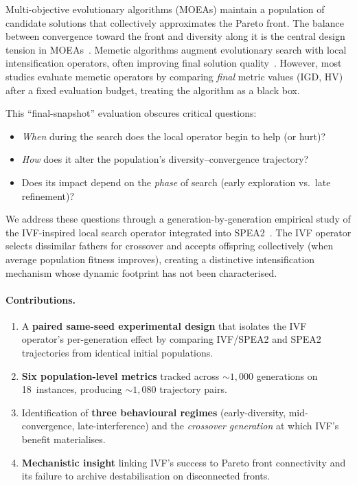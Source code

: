 \documentclass[runningheads]{llncs}
\begin{document}
Multi-objective evolutionary algorithms (MOEAs) maintain a population of
candidate solutions that collectively approximates the Pareto front. The
balance between convergence toward the front and diversity along it is
the central design tension in MOEAs~\cite{deb2002fast, zitzler2001spea2}.
Memetic algorithms augment evolutionary search with local intensification
operators, often improving final solution quality~\cite{ishibuchi2015review}.
However, most studies evaluate memetic operators by comparing \emph{final}
metric values (IGD, HV) after a fixed evaluation budget, treating the
algorithm as a black box.

This ``final-snapshot'' evaluation obscures critical questions:
\begin{itemize}
  \item \emph{When} during the search does the local operator begin to
    help (or hurt)?
  \item \emph{How} does it alter the population's diversity--convergence
    trajectory?
  \item Does its impact depend on the \emph{phase} of search (early
    exploration vs.\ late refinement)?
\end{itemize}

We address these questions through a generation-by-generation empirical
study of the IVF-inspired local search operator integrated into
SPEA2~\cite{sanches2026ivfspea2}. The IVF operator selects dissimilar
fathers for crossover and accepts offspring collectively (when average
population fitness improves), creating a distinctive intensification
mechanism whose dynamic footprint has not been characterised.

\paragraph{Contributions.}
\begin{enumerate}
  \item A \textbf{paired same-seed experimental design} that isolates the
    IVF operator's per-generation effect by comparing IVF/SPEA2 and SPEA2
    trajectories from identical initial populations.
  \item \textbf{Six population-level metrics} tracked across ${\sim}1{,}000$
    generations on 18~instances, producing ${\sim}1{,}080$ trajectory pairs.
  \item Identification of \textbf{three behavioural regimes}
    (early-diversity, mid-convergence, late-interference) and the
    \emph{crossover generation} at which IVF's benefit materialises.
  \item \textbf{Mechanistic insight} linking IVF's success to Pareto front
    connectivity and its failure to archive destabilisation on
    disconnected fronts.
\end{enumerate}
\end{document}

